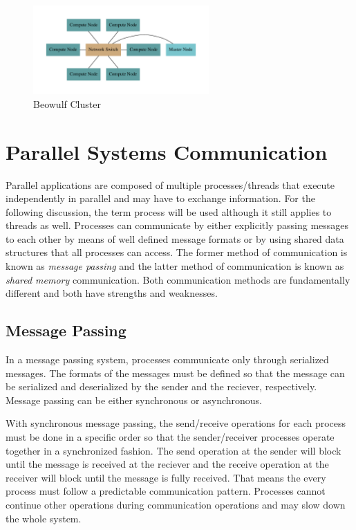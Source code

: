 \documentclass[11pt]{book}
\begin{document}
\begin{figure}
  \centering
  \includegraphics[width=0.6\textwidth,quiet]{figs/graphviz/beowulf.pdf}
  \caption{Beowulf Cluster}\label{beowulf}
\end{figure}

\section{Parallel Systems Communication}

Parallel applications are composed of multiple processes/threads that execute independently
in parallel and may have to exchange information. For the following discussion, the term process
will be used although it still applies to threads as well.  Processes can communicate by
either explicitly passing messages to each other by means of well defined message
formats or by using shared data structures that all processes can access.  The former method
of communication is known as \emph{message passing} and the latter method of communication
is known as \emph{shared memory} communication.  Both communication methods are fundamentally
different and both have strengths and weaknesses.

\subsection{Message Passing}

In a message passing system, processes communicate only through serialized messages.  The formats
of the messages must be defined so that the message can be serialized and deserialized by the
sender and the reciever, respectively.  Message passing can be either synchronous or asynchronous.

With synchronous message passing, the send/receive operations for each process must be done in
a specific order so that the sender/receiver processes operate together in a synchronized fashion.
The send operation at the sender will block until the message is received at the reciever and the
receive operation at the receiver will block until the message is fully received.  That
means the every process must follow a predictable communication pattern.  Processes cannot
continue other operations during communication operations and may slow down the whole
system.
\end{document}
